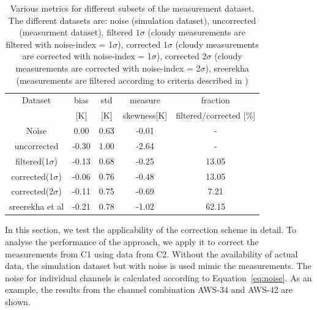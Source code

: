 \documentclass[12pt]{article}
\begin{document}
\begin{table}[!bt]
	\centering
	\begin{tabular}[b]{c|c|c|c|c}
		Dataset  		  &   bias &   std &   measure  & fraction  \\
		&   [K]  &   [K] & skewness[K] & filtered/corrected [\%]\\
		\hline
Noise             &   0.00 &  0.63 &              -0.01 &                - \\
uncorrected       &  -0.30 &  1.00 &              -2.64 &                - \\
filtered(1$\sigma$)   &  -0.13 &  0.68 &              -0.25 &             13.05 \\
corrected(1$\sigma$) &  -0.06 &  0.76 &              -0.48 &               13.05 \\
corrected(2$\sigma$) &  -0.11 &  0.75 &              -0.69 &                7.21 \\
sreerekha et al   &  -0.21 &  0.78 &              -1.02 &               62.15 \\

		\hline
	\end{tabular}
	\caption{Various metrics for different subsets of the measurement dataset. The different datasets are: noise (simulation dataset), uncorrected (measurment dataset), filtered $1\sigma$ (cloudy measurements are filtered with noise-index = 1$\sigma$), corrected $1\sigma$ (cloudy measurements are corrected with noise-index = 1$\sigma$), corrected $2\sigma$ (cloudy measurements are corrected with noise-index = 2$\sigma$), sreerekha (measurements are filtered according to criteria described in \cite{rekha2012potential})   }
	\label{tab:correction:stats:34:42}
\end{table}
%
In this section, we test the applicability of the correction scheme in detail. To analyse the performance of the approach, we apply it to correct the measurements from C1 using data from C2. Without the availability of actual data, the simulation dataset but with noise is used mimic the measurements. The noise for individual channels is calculated according to Equation~\ref{eq:noise}. As an example, the results from the channel combination AWS-34 and AWS-42 are shown.
\end{document}
